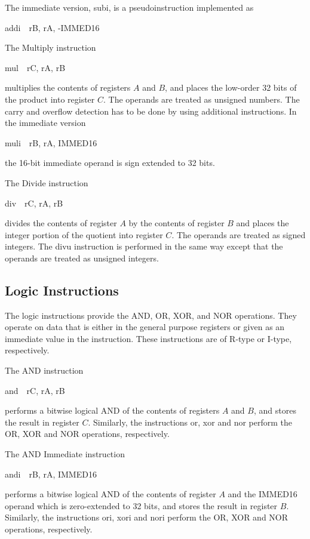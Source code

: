 \documentclass[11pt, twoside, pdftex]{article}
\begin{document}
\noindent
The immediate version, {\sf subi}, is a pseudoinstruction implemented as
\begin{center}
{\sf addi~~rB, rA, -IMMED16}
\end{center}
 

\noindent
The Multiply instruction
\begin{center}
{\sf mul~~rC, rA, rB}
\end{center}
\noindent
multiplies the contents of registers $A$ and $B$, and places the low-order 32 bits of the product
into register $C$. The operands are treated as unsigned numbers. The carry and overflow
detection has to be done by using additional instructions. In the immediate version
\begin{center}
{\sf muli~~rB, rA, IMMED16}
\end{center}
\noindent
the 16-bit immediate operand is sign extended to 32 bits.
 
\noindent
The Divide instruction
\begin{center}
{\sf div~~rC, rA, rB}
\end{center}
\noindent
divides the contents of register $A$ by the contents of register $B$ and places the integer
portion of the quotient into register $C$. The operands are treated as signed integers.
The {\sf divu} instruction is performed in the same way except that the operands are treated 
as unsigned integers.

\subsection{Logic Instructions}

The logic instructions provide the AND, OR, XOR, and NOR operations. They operate on data
that is either in the general purpose registers or given as an immediate value in the instruction. 
These instructions are of R-type or I-type, respectively.
 

\noindent
The AND instruction
\begin{center}
{\sf and~~rC, rA, rB} 
\end{center}
\noindent
performs a bitwise logical AND of the contents of registers $A$ and $B$, and stores the result
in register $C$. Similarly, the instructions {\sf or}, {\sf xor} and {\sf nor} perform the OR, XOR 
and NOR operations, respectively.
 

\noindent
The AND Immediate instruction
\begin{center}
{\sf andi~~rB, rA, IMMED16} 
\end{center}
\noindent
performs a bitwise logical AND of the contents of register $A$ and the IMMED16 operand
which is zero-extended to 32 bits, and stores the result in register $B$.
Similarly, the instructions {\sf ori}, {\sf xori} and {\sf nori} perform the OR, XOR 
and NOR operations, respectively.
 
\end{document}
